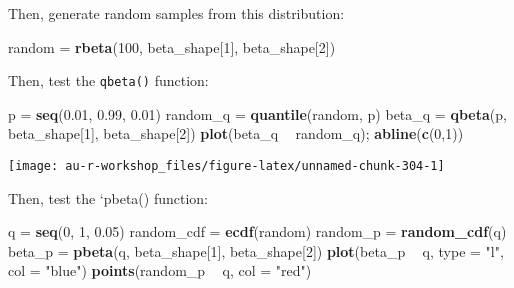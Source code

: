 \documentclass[]{book}
\newenvironment{Shaded}{\begin{snugshade}}{\end{snugshade}}
\newcommand{\KeywordTok}[1]{\textcolor[rgb]{0.13,0.29,0.53}{\textbf{#1}}}
\newcommand{\DataTypeTok}[1]{\textcolor[rgb]{0.13,0.29,0.53}{#1}}
\newcommand{\DecValTok}[1]{\textcolor[rgb]{0.00,0.00,0.81}{#1}}
\newcommand{\FloatTok}[1]{\textcolor[rgb]{0.00,0.00,0.81}{#1}}
\newcommand{\StringTok}[1]{\textcolor[rgb]{0.31,0.60,0.02}{#1}}
\newcommand{\OperatorTok}[1]{\textcolor[rgb]{0.81,0.36,0.00}{\textbf{#1}}}
\newcommand{\NormalTok}[1]{#1}
\theoremstyle{definition}
\theoremstyle{definition}
\theoremstyle{definition}
\theoremstyle{remark}
\begin{document}
Then, generate random samples from this distribution:

\begin{Shaded}
\begin{Highlighting}[]
\NormalTok{random =}\StringTok{ }\KeywordTok{rbeta}\NormalTok{(}\DecValTok{100}\NormalTok{, beta_shape[}\DecValTok{1}\NormalTok{], beta_shape[}\DecValTok{2}\NormalTok{])}
\end{Highlighting}
\end{Shaded}

Then, test the \texttt{qbeta()} function:

\begin{Shaded}
\begin{Highlighting}[]
\NormalTok{p =}\StringTok{ }\KeywordTok{seq}\NormalTok{(}\FloatTok{0.01}\NormalTok{, }\FloatTok{0.99}\NormalTok{, }\FloatTok{0.01}\NormalTok{)}
\NormalTok{random_q =}\StringTok{ }\KeywordTok{quantile}\NormalTok{(random, p)}
\NormalTok{beta_q =}\StringTok{ }\KeywordTok{qbeta}\NormalTok{(p, beta_shape[}\DecValTok{1}\NormalTok{], beta_shape[}\DecValTok{2}\NormalTok{])}
\KeywordTok{plot}\NormalTok{(beta_q }\OperatorTok{~}\StringTok{ }\NormalTok{random_q); }\KeywordTok{abline}\NormalTok{(}\KeywordTok{c}\NormalTok{(}\DecValTok{0}\NormalTok{,}\DecValTok{1}\NormalTok{))}
\end{Highlighting}
\end{Shaded}

\begin{center}\texttt{[image: au-r-workshop\_files/figure-latex/unnamed-chunk-304-1]} \end{center}

Then, test the `pbeta() function:

\begin{Shaded}
\begin{Highlighting}[]
\NormalTok{q =}\StringTok{ }\KeywordTok{seq}\NormalTok{(}\DecValTok{0}\NormalTok{, }\DecValTok{1}\NormalTok{, }\FloatTok{0.05}\NormalTok{)}
\NormalTok{random_cdf =}\StringTok{ }\KeywordTok{ecdf}\NormalTok{(random)}
\NormalTok{random_p =}\StringTok{ }\KeywordTok{random_cdf}\NormalTok{(q)}
\NormalTok{beta_p =}\StringTok{ }\KeywordTok{pbeta}\NormalTok{(q, beta_shape[}\DecValTok{1}\NormalTok{], beta_shape[}\DecValTok{2}\NormalTok{])}
\KeywordTok{plot}\NormalTok{(beta_p }\OperatorTok{~}\StringTok{ }\NormalTok{q, }\DataTypeTok{type =} \StringTok{"l"}\NormalTok{, }\DataTypeTok{col =} \StringTok{"blue"}\NormalTok{)}
\KeywordTok{points}\NormalTok{(random_p }\OperatorTok{~}\StringTok{ }\NormalTok{q, }\DataTypeTok{col =} \StringTok{"red"}\NormalTok{)}
\end{Highlighting}
\end{Shaded}
\end{document}
